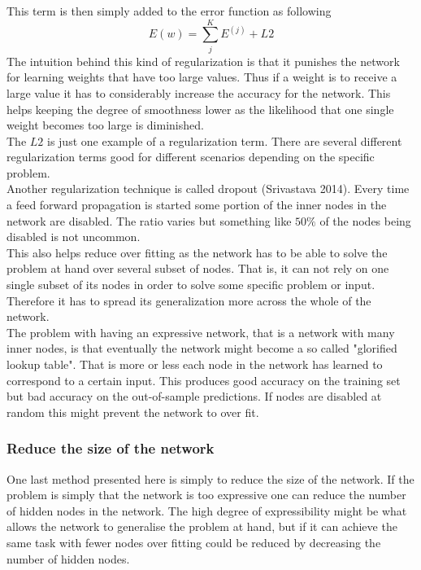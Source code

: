 \documentclass[11pt, letterpaper]{amsart}
\begin{document}
This term is then simply added to the error function as following
\begin{equation}
E(w) = \sum_j^K E^{(j)} + L2
\end{equation}
The intuition behind this kind of regularization is that it punishes the network for learning weights that have too large values. Thus if a weight is to receive a large value it has to considerably increase the accuracy for the network. This helps keeping the degree of smoothness lower as the likelihood that one single weight becomes too large is diminished.
\\

The $L2$ is just one example of a regularization term. There are several different regularization terms good for different scenarios depending on the specific problem.
\\

Another regularization technique is called dropout (Srivastava 2014). Every time a feed forward propagation is started some portion of the inner nodes in the network are disabled. The ratio varies but something like $50\%$ of the nodes being disabled is not uncommon.
\\

This also helps reduce over fitting as the network has to be able to solve the problem at hand over several subset of nodes. That is, it can not rely on one single subset of its nodes in order to solve some specific problem or input. Therefore it has to spread its generalization more across the whole of the network.
\\

The problem with having an expressive network, that is a network with many inner nodes, is that eventually the network might become a so called "glorified lookup table". That is more or less each node in the network has learned to correspond to a certain input. This produces good accuracy on the training set but bad accuracy on the out-of-sample predictions. If nodes are disabled at random this might prevent the network to over fit.
\subsubsection{Reduce the size of the network}
One last method presented here is simply to reduce the size of the network. If the problem is simply that the network is too expressive one can reduce the number of hidden nodes in the network. The high degree of expressibility might be what allows the network to generalise the problem at hand, but if it can achieve the same task with fewer nodes over fitting could be reduced by decreasing the number of hidden nodes.
\end{document}
